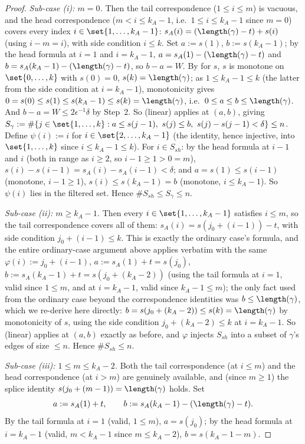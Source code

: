 \begin{proof}
  \emph{Sub-case (i): $m=0$.} Then the tail correspondence ($1\le i\le m$) is vacuous, and the
  head correspondence ($m<i\le k_A-1$, i.e.\ $1\le i\le k_A-1$ since $m=0$) covers every index
  $i\in\set{1,\dots,k_A-1}$: $s_A(i)=(\length(\gamma)-t)+s(i)$ (using $i-m=i$), with side condition
  $i\le k$. Set $a:=s(1)$, $b:=s(k_A-1)$; by the head formula at $i=1$ and $i=k_A-1$,
  $a=s_A(1)-(\length(\gamma)-t)$ and $b=s_A(k_A-1)-(\length(\gamma)-t)$, so $b-a=W$.
  By  for $s$, $s$ is monotone on $\set{0,\dots,k}$ with $s(0)=0$,
  $s(k)=\length(\gamma)$; as $1\le k_A-1\le k$ (the latter from the side condition at $i=k_A-1$),
  monotonicity gives $0=s(0)\le s(1)\le s(k_A-1)\le s(k)=\length(\gamma)$, i.e.\ $0\le a\le b\le
  \length(\gamma)$. And $b-a=W\le2\epsilon^{-1}\delta$ by Step~2. So (linear) applies at $(a,b)$,
  giving $S_\gamma:=\#\{j\in\set{1,\dots,k}:a\le s(j-1),\ s(j)\le b,\ s(j)-s(j-1)<\delta\}\le n$.
  Define $\psi(i):=i$ for $i\in\set{2,\dots,k_A-1}$ (the identity, hence injective, into
  $\set{1,\dots,k}$ since $i\le k_A-1\le k$). For $i\in S_{sh}$: by the head formula at $i-1$ and
  $i$ (both in range as $i\ge2$, so $i-1\ge1>0=m$), $s(i)-s(i-1)=s_A(i)-s_A(i-1)<\delta$; and
  $a=s(1)\le s(i-1)$ (monotone, $i-1\ge1$), $s(i)\le s(k_A-1)=b$ (monotone, $i\le k_A-1$). So
  $\psi(i)$ lies in the filtered set. Hence $\#S_{sh}\le S_\gamma\le n$.

  \emph{Sub-case (ii): $m\ge k_A-1$.} Then every $i\in\set{1,\dots,k_A-1}$ satisfies $i\le m$, so
  the tail correspondence covers all of them: $s_A(i)=s(j_0+(i-1))-t$, with side condition
  $j_0+(i-1)\le k$. This is exactly the ordinary case's formula, and the entire ordinary-case
  argument above applies verbatim with the same $\varphi(i):=j_0+(i-1)$, $a:=s_A(1)+t=s(j_0)$,
  $b:=s_A(k_A-1)+t=s(j_0+(k_A-2))$ (using the tail formula at $i=1$, valid since $1\le m$, and at
  $i=k_A-1$, valid since $k_A-1\le m$); the only fact used from the ordinary case beyond the
  correspondence identities was $b\le\length(\gamma)$, which we re-derive here directly:
  $b=s(j_0+(k_A-2))\le s(k)=\length(\gamma)$ by monotonicity of $s$, using the side condition
  $j_0+(k_A-2)\le k$ at $i=k_A-1$. So (linear) applies at $(a,b)$ exactly as before, and $\varphi$
  injects $S_{sh}$ into a subset of $\gamma$'s edges of size $\le n$. Hence $\#S_{sh}\le n$.

  \emph{Sub-case (iii): $1\le m\le k_A-2$.} Both the tail correspondence (at $i\le m$) and the
  head correspondence (at $i>m$) are genuinely available, and (since $m\ge1$) the splice identity
  $s(j_0+(m-1))=\length(\gamma)$ holds. Set
  \[
    a := s_A(1)+t, \qquad b := s_A(k_A-1)-(\length(\gamma)-t)
    .
  \]
  By the tail formula at $i=1$ (valid, $1\le m$), $a=s(j_0)$; by the head formula at $i=k_A-1$
  (valid, $m<k_A-1$ since $m\le k_A-2$), $b=s(k_A-1-m)$.


\end{proof}
